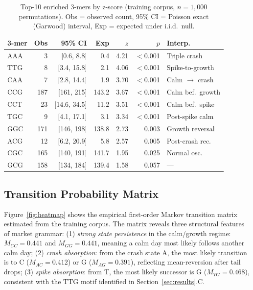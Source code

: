 \documentclass[11pt]{article}
\begin{document}
\begin{table}[t]
\centering
\caption{Top-10 enriched 3-mers by z-score (training corpus, $n=1{,}000$
  permutations). Obs = observed count, 95\% CI = Poisson exact (Garwood)
  interval, Exp = expected under i.i.d.\ null.}
\label{tab:kmers}
\small
\setlength{\tabcolsep}{4pt}
\begin{tabular}{lrrrrrl}
\toprule
\textbf{3-mer} & \textbf{Obs} & \textbf{95\% CI} & \textbf{Exp} & \textbf{$z$} & \textbf{$p$} & \textbf{Interp.} \\
\midrule
AAA & 3    & [0.6, 8.8]    & 0.4   & 4.21 & $<$0.001 & Triple crash \\
TTG & 8    & [3.4, 15.8]   & 2.1   & 4.06 & $<$0.001 & Spike-to-growth \\
CAA & 7    & [2.8, 14.4]   & 1.9   & 3.70 & $<$0.001 & Calm $\to$ crash \\
CCG & 187  & [161, 215]    & 143.2 & 3.67 & $<$0.001 & Calm bef.\ growth \\
CCT & 23   & [14.6, 34.5]  & 11.2  & 3.51 & $<$0.001 & Calm bef.\ spike \\
TGC & 9    & [4.1, 17.1]   & 3.1   & 3.34 & $<$0.001 & Post-spike calm \\
GGC & 171  & [146, 198]    & 138.8 & 2.73 & 0.003    & Growth reversal \\
ACG & 12   & [6.2, 20.9]   & 5.8   & 2.57 & 0.005    & Post-crash rec. \\
CGC & 165  & [140, 191]    & 141.7 & 1.95 & 0.025    & Normal osc. \\
GCG & 158  & [134, 184]    & 139.4 & 1.58 & 0.057    & --- \\
\bottomrule
\end{tabular}
\end{table}

\subsection{Transition Probability Matrix}

Figure~\ref{fig:heatmap} shows the empirical first-order Markov
transition matrix estimated from the training corpus.  The matrix
reveals three structural features of market grammar: (1) \emph{strong
state persistence} in the calm/growth regime: $M_{CC} = 0.441$ and
$M_{GG} = 0.441$, meaning a calm day most likely follows another calm
day; (2) \emph{crash absorption}: from the crash state A, the most
likely transition is to C ($M_{AC} = 0.412$) or G ($M_{AG} = 0.391$),
reflecting mean-reversion after tail drops; (3) \emph{spike
absorption}: from T, the most likely successor is G ($M_{TG} = 0.468$),
consistent with the TTG motif identified in Section~\ref{sec:results}.C.
\end{document}
